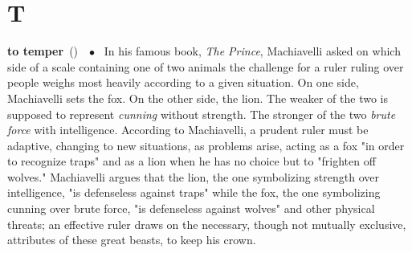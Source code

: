 \documentclass[10pt,a4paper,twoside]{article} %
\newcommand{\entry}[4]{\markboth{#1}{#1}\textbf{#1}\ {(#2)}\ \textit{#3}\ $\bullet$\ {#4}}  %
\begin{document}

\section*{T}

\begin{multicols}{2}

\entry{to temper} {} {} {
In his famous book, \emph{The Prince}, Machiavelli asked on which side of a scale containing one of two animals the challenge for a ruler ruling over people weighs most heavily according to a given situation. On one side, Machiavelli sets the fox. On the other side, the lion. The weaker of the two is supposed to represent \emph{cunning} without strength. The stronger of the two \emph{brute force} with intelligence.  According to Machiavelli, a prudent ruler must be adaptive, changing to new situations, as problems arise, acting as a fox "in order to recognize traps" and as a lion when he has no choice but to "frighten off wolves." Machiavelli argues that the lion, the one symbolizing strength over intelligence, "is defenseless against traps" while the fox, the one symbolizing cunning over brute force, "is defenseless against wolves" and other physical threats; an effective ruler draws on the necessary, though not mutually exclusive, attributes of these great beasts, to keep his crown.
}
\end{multicols}
\end{document}
